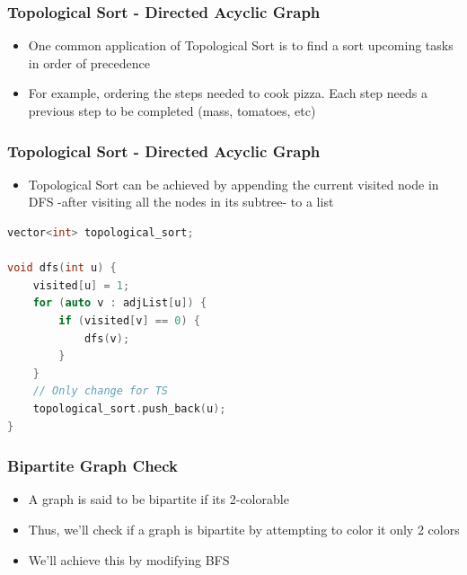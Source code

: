 \documentclass{beamer}
\begin{document}
\begin{frame}[fragile]
\frametitle{Topological Sort - Directed Acyclic Graph}

\begin{itemize}
    \item One common application of Topological Sort is to find a sort upcoming tasks in order of precedence
    \item For example, ordering the steps needed to cook pizza. Each step needs a previous step to be completed (mass, tomatoes, etc)
\end{itemize}

\end{frame}

\begin{frame}[fragile]
\frametitle{Topological Sort - Directed Acyclic Graph}

\begin{itemize}
    \item Topological Sort can be achieved by appending the current visited node in DFS -after visiting all the nodes in its subtree- to a list
\end{itemize}

\pause

\begin{lstlisting}[language=c]
vector<int> topological_sort;

void dfs(int u) {
	visited[u] = 1;
	for (auto v : adjList[u]) {
		if (visited[v] == 0) {
			dfs(v);
		}
	}
	// Only change for TS
	topological_sort.push_back(u);
}
\end{lstlisting}

\end{frame}

\begin{frame}[fragile]
\frametitle{Bipartite Graph Check}

\begin{itemize}
    \item A graph is said to be bipartite if its 2-colorable
    \item Thus, we'll check if a graph is bipartite by attempting to color it only 2 colors
    \item We'll achieve this by modifying BFS
\end{itemize}

\end{frame}
\end{document}

